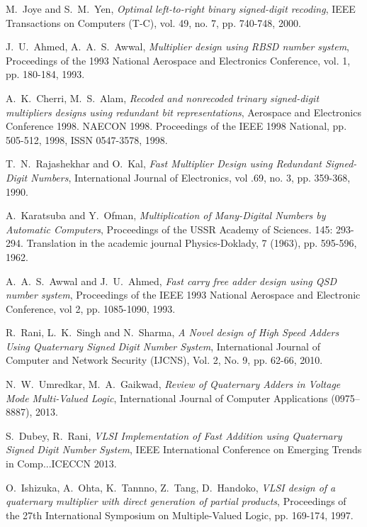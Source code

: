 \documentclass[conference]{IEEEtran_NCC}
\begin{document}
\begin{thebibliography}{1}
M.~Joye and S.~M.~Yen, \emph{Optimal left-to-right binary signed-digit recoding}, IEEE Transactions on Computers (T-C), vol. 49, no. 7, pp. 740-748, 2000.

J.~U.~Ahmed, A.~A.~S.~Awwal, \emph{Multiplier design using RBSD number system}, Proceedings of the 1993 National Aerospace and Electronics Conference, vol. 1, pp. 180-184, 1993.

A.~K.~Cherri, M.~S.~Alam, \emph{Recoded and nonrecoded trinary signed-digit multipliers designs using redundant bit representations}, Aerospace and Electronics Conference 1998. NAECON 1998. Proceedings of the IEEE 1998 National, pp. 505-512, 1998, ISSN 0547-3578, 1998.

T.~N.~Rajashekhar and O.~Kal, \emph{Fast Multiplier Design using Redundant Signed-Digit Numbers}, International Journal of Electronics, vol .69, no. 3, pp. 359-368, 1990.

A.~Karatsuba and Y.~Ofman, \emph{Multiplication of Many-Digital Numbers by Automatic Computers}, Proceedings of the USSR Academy of Sciences. 145: 293-294. Translation in the academic journal Physics-Doklady, 7 (1963), pp. 595-596, 1962.

A.~A.~S.~Awwal and J.~U.~Ahmed, \emph{Fast carry free adder design using QSD number system}, Proceedings of the IEEE 1993 National Aerospace and Electronic Conference, vol 2, pp. 1085-1090, 1993.

R.~Rani, L.~K.~Singh and N.~Sharma, \emph{A Novel design of High Speed Adders Using Quaternary Signed Digit Number System}, International Journal of Computer and Network Security (IJCNS), Vol. 2, No. 9, pp. 62-66, 2010.

N.~W.~Umredkar, M.~A.~Gaikwad, \emph{Review of Quaternary Adders in Voltage Mode  Multi-Valued Logic}, International Journal of Computer Applications (0975–8887), 2013.

S.~Dubey, R.~Rani, \emph{VLSI Implementation of Fast Addition using Quaternary Signed Digit Number System}, IEEE International Conference on Emerging Trends in  Comp...ICECCN 2013.

O.~Ishizuka, A.~Ohta, K.~Tannno, Z.~Tang, D.~Handoko, \emph{VLSI design of a quaternary multiplier with direct generation of partial products}, Proceedings of the 27th International Symposium on Multiple-Valued Logic, pp. 169-174, 1997.


\end{thebibliography}
\end{document}
